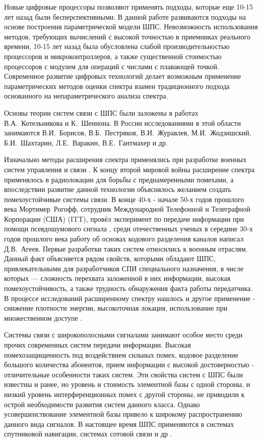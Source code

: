 Новые цифровые процессоры позволяют применять подходы, которые еще 10-15 лет назад были бесперспективными.
В данной работе развиваются подходы на основе построения параметрической модели ШПС. Невозможность использования
методов, требующих вычислений с высокой точностью в приемниках реального времени,
10-15 лет назад была обусловлена слабой производительностью процессоров и микроконтроллеров, а также существенной
стоимостью процессоров с модулем для операций с числами с плавающей точкой. Современное развитие цифровых технологий делает 
возможным применение параметрических методов оценки спектра взамен традиционного подхода основанного на непараметрического
анализа спектра.

Основы теории систем связи с ШПС были заложены в работах \mbox{В.А. Котельникова} и \mbox{К. Шеннона}.
В России исследованиями в этой области занимаются \mbox{В.И. Борисов}, \mbox{В.Б. Пестряков}, \mbox{В.И. Журавлев}, \mbox{М.И. Жодзишский},
\mbox{Б.И. Шахтарин}, \mbox{Л.Е.  Варакин}, \mbox{В.Е. Гантмахер} и др.

Изначально методы расширения спектра применялись при разработке военных систем управления и связи \cite{sklyar}.
К концу второй мировой войны расширение спектра применялось в радиолокации для борьбы с преднамеренными помехами, а
впоследствии развитие данной технологии объяснялось желанием создать помехоустойчивые системы связи.
В конце 40-х - начале 50-х годов прошлого века \mbox{Мортимер Рогофф}, сотрудник Международной Телефонной и Телеграфной Корпорации (США) (ITT),
провёл эксперимент по передаче информации при помощи псевдошумового сигнала \cite{sklyar}, среди отечественных ученых
в середине 30-х годов прошлого века работу об основах кодового разделения каналов написал \mbox{Д.В. Агеев.}
Первые разработки таких систем относились к военным отраслям. Данный факт объясняется рядом свойств, которыми обладают
ШПС, привлекательными для разработчиков СПИ специального назначения, в числе которых — сложность перехвата заложенной в них информации,
высокая помехоустойчивость, а также трудность обнаружения факта работы передатчика. В процессе исследований расширенному спектру
нашлось и другое применение - снижение плотности энергии, высокоточная локация, использование при множественном доступе
\cite{sklyar}.

Системы связи с широкополосными сигналами занимают особое место среди прочих современных систем передачи информации.
Высокая помехозащищенность под воздействием сильных помех, кодовое разделение большого количества абонентов, прием
информации с высокой достоверностью - отличительные особенности таких систем. Эти свойства систем с ШПС были известны и ранее, но
уровень и стоимость элементной базы с одной стороны, и низкий уровень интерференционных помех с другой стороны, не приводили к острой необходимости развития систем данного класса.
Однако усовершенствование элементной базы привело к широкому распространению данного вида сигналов. В настоящее время ШПС применяются в системах спутниковой навигации,
системах сотовой связи и др \cite{varakin-book}.

